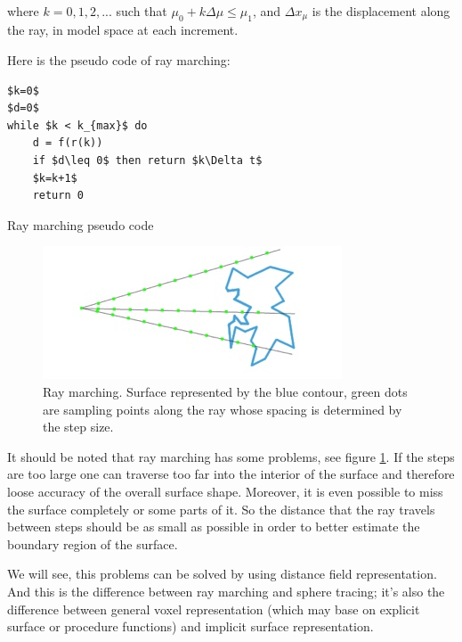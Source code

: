 where $k=0,1,2,...$ such that $\mu_{0}+k\Delta\mu\leq\mu_{1}$, and $\Delta x_{\mu}$ is the displacement along the ray, in model space at each increment.


Here is the pseudo code of ray marching:

\begin{algorithm}
\begin{lstlisting}[mathescape]
$k=0$
$d=0$
while $k < k_{max}$ do
	d = f(r(k))
	if $d\leq 0$ then return $k\Delta t$
	$k=k+1$
	return 0
\end{lstlisting}
\caption{Ray marching pseudo code}
\end{algorithm}
   

\begin{figure}\label{f:ray-marching-problems}
	\begin{center}	
		\includegraphics[width=1.\textwidth]{graphics/df/ray-marching-problems}
	\end{center}
	\caption{Ray marching. Surface represented by the blue contour, green dots are sampling points along the ray whose spacing is determined by the step size.}
\end{figure}

It should be noted that ray marching has some problems, see figure \ref{f:ray-marching-problems}. If the steps are too large one can traverse too far into the interior of the surface and therefore loose accuracy of the overall surface shape. Moreover, it is even possible to miss the surface completely or some parts of it. So the distance that the ray travels between steps should be as small as possible in order to better estimate the boundary region of the surface.


We will see, this problems can be solved by using distance field representation. And this is the difference between ray marching and sphere tracing; it's also the difference between general voxel representation (which may base on explicit surface or procedure functions) and implicit surface representation.

